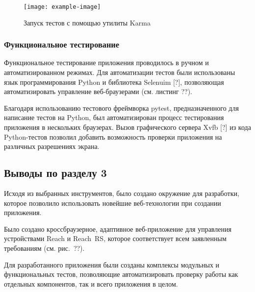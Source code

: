\begin{figure}[h!]
  \centering
  \setlength{\fboxsep}{5pt}
  \texttt{[image: example-image]}
  \vspace*{6pt}
  \caption{Запуск тестов с помощью утилиты Karma}
  \label{fig:karma-output}
\end{figure}


\subsubsection{Функциональное тестирование}

Функциональное тестирование приложения проводилось в ручном и автоматизированном режимах. Для автоматизации тестов были использованы язык программирования Python и библиотека Selenuim [?], позволяющая автоматизировать управление веб-браузерами (см. листинг ??).

Благодаря использованию тестового фреймворка pytest, предназначенного для написание тестов на Python, был автоматизирован процесс тестирования приложения в нескольких браузерах. Вызов графического сервера Xvfb [?] из кода Python-тестов позволил добавить возможность проверки приложения на различных разрешениях экрана.

{\color{gray}{*listing*}}



\subsection{Выводы по разделу 3}

\begin{dashitemize}
  \item Исходя из выбранных инструментов, было создано окружение для разработки, которое позволило использовать новейшие веб-технологии при создании приложения.
  \item Было создано кроссбраузерное, адаптивное веб-приложение для управления устройствами Reach и Reach~RS, которое соответствует всем заявленным требованиям (см. рис.~??).
  \item Для разработанного приложения были созданы комплексы модульных и функциональных тестов, позволяющие автоматизировать проверку работы как отдельных компонентов, так и всего приложения в целом.
\end{dashitemize}

